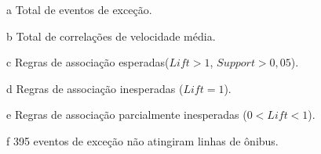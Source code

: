 \documentclass[
	12pt,				%
	oneside,			%
	a4paper,			%
	english,			%
	brazil				%
	]{abntex2ppgsi}
\begin{document}
{{\begin{apendicesenv}
\begin{table}[!htb]
\begin{threeparttable}
\begin{tablenotes}
            \item[a] Total de eventos de exceção.
            \item[b] Total de correlações de velocidade média.
            \item[c] Regras de associação esperadas($Lift > 1$, $Support > 0,05$).
            \item[d] Regras de associação inesperadas ($Lift = 1$).
            \item[e] Regras de associação parcialmente inesperadas ($0 < Lift < 1$).
            \item[f] 395 eventos de exceção não atingiram linhas de ônibus.
        \end{tablenotes}
\end{threeparttable}
\end{table}



\end{apendicesenv}}}
\end{document}
